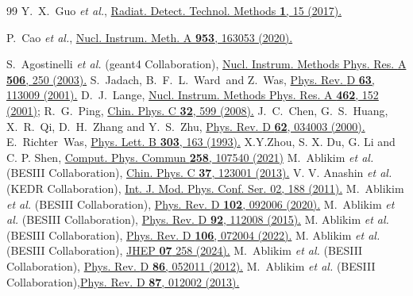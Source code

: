 \documentclass[amsmath,amssymb,twocolumn,prd,floatfix,showpacs,nofootinbib]{revtex4-1}
\begin{document}
\begin{thebibliography}{99}
 Y.~X.~Guo {\it et al.}, \href{https://link.springer.com/article/10.1007/s41605-017-0012-4} {Radiat. Detect. Technol. Methods {\bf 1}, 15 (2017).}

 P.~Cao {\it et al.}, \href{https://www.sciencedirect.com/science/article/pii/S0168900219314068} {Nucl. Instrum. Meth. A {\bf 953}, 163053 (2020).}

 S.~Agostinelli \textit{et al.} ({\sc geant4} Collaboration), \href{https://www.sciencedirect.com/science/article/pii/S0168900203013688?via\%3Dihub}{Nucl. Instrum. Methods Phys. Res. {A \bf506}, 250 (2003).}
 S.~Jadach, B.~F.~L.~Ward~and Z.~Was, \href{https://journals.aps.org/prd/abstract/10.1103/PhysRevD.63.113009}{Phys. Rev. {D \bf63}, 113009 (2001).}
 D.~J.~Lange,  \href{https://www.sciencedirect.com/science/article/pii/S0168900201000894?via\%3Dihub}{Nucl. Instrum. Methods Phys. Res. {A \bf462}, 152 (2001);}
 R.~G.~Ping, \href{https://iopscience.iop.org/article/10.1088/1674-1137/32/8/001}{Chin. Phys. {C \bf32}, 599 (2008).}
 J.~C.~Chen, G.~S.~Huang, X.~R.~Qi, D.~H.~Zhang and Y.~S.~Zhu, \href{https://journals.aps.org/prd/abstract/10.1103/PhysRevD.62.034003}{Phys. Rev. {D \bf62}, 034003 (2000).}
 E.~Richter~Was, \href{https://www.sciencedirect.com/science/article/pii/037026939390062M}{Phys. Lett. {B \bf303}, 163 (1993).}
 X.Y.Zhou, S. X. Du, G. Li and C. P. Shen, \href{https://doi.org/10.1016/j.cpc.2020.107540}{Comput. Phys. Commun {\bf258}, 107540 (2021)}
 M.~Ablikim {\it et al.} (BESIII Collaboration), \href{https://iopscience.iop.org/article/10.1088/1674-1137/37/12/123001}{Chin. Phys. {C \bf37}, 123001 (2013).}
 V. V. Anashin {\it et al.} (KEDR Collaboration),
\href{https://www.worldscientific.com/doi/abs/10.1142/S2010194511000791}{Int. J. Mod. Phys. Conf. Ser. 02, 188 (2011).}
 M.~Ablikim {\it et al.} (BESIII Collaboration), \href{https://journals.aps.org/prd/abstract/10.1103/PhysRevD.102.092006}{Phys. Rev. {D \bf102}, 092006 (2020).}
 M.~Ablikim {\it et al.} (BESIII Collaboration), \href{https://journals.aps.org/prd/abstract/10.1103/PhysRevD.92.112008}{Phys. Rev. {D \bf92}, 112008 (2015).}
 M. Ablikim {\it et al.} (BESIII Collaboration),
\href{https://journals.aps.org/prd/abstract/10.1103/PhysRevD.106.072004}{Phys. Rev. D {\bf 106}, 072004 (2022).}
 M. Ablikim {\it et al.} (BESIII Collaboration),
\href{https://link.springer.com/article/10.1007/JHEP07(2024)258}{JHEP {\bf 07} 258 (2024).}
 M.~Ablikim {\it et al.} (BESIII Collaboration), \href{https://journals.aps.org/prd/abstract/10.1103/PhysRevD.86.052011}{Phys. Rev. {D \bf86}, 052011 (2012).}
 M.~Ablikim {\it et al.} (BESIII Collaboration),\href{https://doi.org/10.1103/PhysRevD.87.012002}{Phys. Rev. {D \bf87}, 012002 (2013).}



\end{thebibliography}
\end{document}
